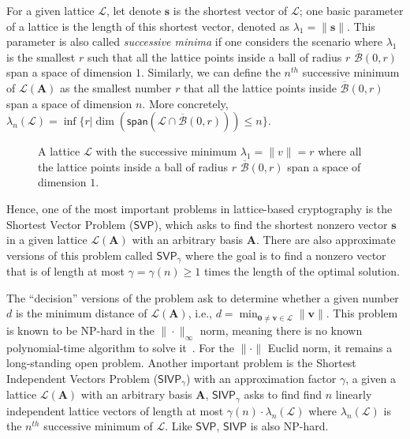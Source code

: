 \documentclass[cryptography,review,submit,pdftex,moreauthors,amsmath,amssymb,aps,strict]{Definitions/mdpi}
\begin{document}
For a given lattice $\mathcal{L}$, let denote $\mathbf{s}$ is the shortest vector of $\mathcal{L}$; one basic parameter of a lattice is the length of this shortest vector, denoted as $\lambda_1 = \|\mathbf{s}\|$. This parameter is also called \textit{successive minima} if one considers the scenario where $\lambda_1$ is the smallest $r$ such that all the lattice points inside a ball of radius $r$ $\overline{\mathcal{B}}(0,r)$ span a space of dimension $1$. Similarly, we can define the $n^{th}$ successive minimum of $\mathcal{L}(\mathbf{A})$ as the smallest number $r$ that all the lattice points inside $\overline{\mathcal{B}}(0,r)$ span a space of dimension $n$. More concretely,
$\lambda_n(\mathcal{L}) = \inf\{r|\dim(\mathsf{span}(\mathcal{L}\cap \overline{\mathcal{B}}(0,r)))\leq n\}$.

\begin{figure}[!htb]
    \centering
    
    \caption{A lattice $\mathcal{L}$ with the successive minimum $\lambda_1=\|v\|=r$ where all the lattice points inside a ball of radius $r$ $\overline{\mathcal{B}}(0,r)$ span a space of dimension $1$.}
    \label{fig:lattice_sucessive_minimum}
\end{figure}

Hence, one of the most important problems in lattice-based cryptography is the Shortest Vector Problem ($\mathsf{SVP}$), which asks to find the shortest nonzero vector $\mathbf{s}$ in a given lattice $\mathcal{L}(\mathbf{A})$ with an arbitrary basis $\mathbf{A}$. There are also approximate versions of this problem called $\mathsf{SVP}_{\gamma}$ where the goal is to find a nonzero vector that is of length at most $\gamma = \gamma(n)\geq 1$ times the length of the optimal solution.

The ``decision'' versions of the problem ask to determine whether a given number $d$ is the minimum distance of $\mathcal{L}(\mathbf{A})$, i.e., $d = \min_{\mathbf{0}\neq \mathbf{v}\in\mathcal{L}}\|\mathbf{v}\|$.
This problem is known to be NP-hard in the $\|\cdot\|_{\infty}$ norm, meaning there is no known polynomial-time algorithm to solve it~\cite{hardness_of_SVP}. For the $\|\cdot\|$ Euclid norm, it remains a long-standing open problem. Another important problem is the Shortest Independent Vectors Problem ($\mathsf{SIVP}_{\gamma}$) with an approximation factor $\gamma$, a given a lattice $\mathcal{L}(\mathbf{A})$ with an arbitrary basis $\mathbf{A}$, $\mathsf{SIVP}_{\gamma}$ asks to find find $n$ linearly independent lattice vectors of length at most $\gamma(n)\cdot \lambda_{n}(\mathcal{L})$ where $\lambda_{n}(\mathcal{L})$ is the $n^{th}$ successive minimum of $\mathcal{L}$. Like $\mathsf{SVP}$, $\mathsf{SIVP}$ is also NP-hard.
\end{document}

